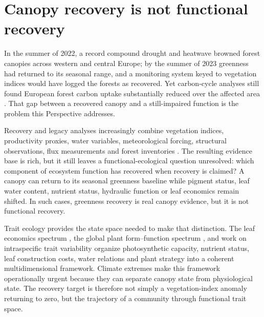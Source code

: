 \documentclass[pdflatex,sn-mathphys-num]{sn-jnl}
\begin{document}

\maketitle

\section{Canopy recovery is not functional recovery}

In the summer of 2022, a record compound drought and heatwave browned forest canopies across western and central Europe; by the summer of 2023 greenness had returned to its seasonal range, and a monitoring system keyed to vegetation indices would have logged the forests as recovered. Yet carbon-cycle analyses still found European forest carbon uptake substantially reduced over the affected area \cite{bastos2023europe,vanderwoude2023carbon,li2024greenness}. That gap between a recovered canopy and a still-impaired function is the problem this Perspective addresses.

Recovery and legacy analyses increasingly combine vegetation indices, productivity proxies, water variables, meteorological forcing, structural observations, flux measurements and forest inventories \cite{vanderwoude2023carbon,bastos2023europe,forzieri2021vulnerability,anderegg2015tree,seidl2017,yan2025forestrecovery,smith2022resilience,tai2023linking}. The resulting evidence base is rich, but it still leaves a functional-ecological question unresolved: which component of ecosystem function has recovered when recovery is claimed? A canopy can return to its seasonal greenness baseline while pigment status, leaf water content, nutrient status, hydraulic function or leaf economics remain shifted. In such cases, greenness recovery is real canopy evidence, but it is not functional recovery.

Trait ecology provides the state space needed to make that distinction. The leaf economics spectrum \cite{wright2004leafeconomic,reich2014worldwide}, the global plant form--function spectrum \cite{diaz2016global,joswig2022climatic,bruelheide2018global}, and work on intraspecific trait variability \cite{violle2012returnfunctional,albert2010multitrait,siefert2015global,westerband2021intraspecific} organize photosynthetic capacity, nutrient status, leaf construction costs, water relations and plant strategy into a coherent multidimensional framework. Climate extremes make this framework operationally urgent because they can separate canopy state from physiological state. The recovery target is therefore not simply a vegetation-index anomaly returning to zero, but the trajectory of a community through functional trait space.
\end{document}
